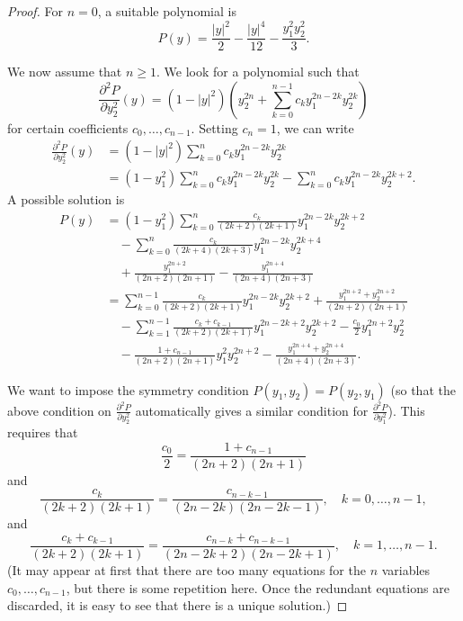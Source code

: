 \documentclass[10pt,a4paper]{amsart}
\begin{document}
\begin{proof}
For $n = 0$, a suitable polynomial is
\[
P(y) = \frac{|y|^2}{2} - \frac{|y|^4}{12} - \frac{y_1^2 y_2^2}{3}.
\]

We now assume that $n \ge 1$. We look for a polynomial such that
\[
\frac{\partial^2 P}{\partial y_2^2}(y) = (1 - |y|^2) \left(y_2^{2n} + \sum_{k = 0}^{n - 1} c_k y_1^{2n - 2k} y_2^{2k}\right)
\]
for certain coefficients $c_0, \dotsc, c_{n - 1}$. Setting $c_n = 1$, we
can write
\[
\begin{split}
\frac{\partial^2 P}{\partial y_2^2}(y) & = (1 - |y|^2) \sum_{k = 0}^n c_k y_1^{2n - 2k} y_2^{2k} \\
& = (1 - y_1^2) \sum_{k = 0}^n c_k y_1^{2n - 2k} y_2^{2k} - \sum_{k = 0}^n c_k y_1^{2n - 2k} y_2^{2k + 2}.
\end{split}
\]
A possible solution is
\[
\begin{split}
P(y) & = (1 - y_1^2) \sum_{k = 0}^n \frac{c_k}{(2k + 2)(2k + 1)} y_1^{2n - 2k} y_2^{2k + 2} \\
& \quad - \sum_{k = 0}^n \frac{c_k}{(2k + 4)(2k + 3)} y_1^{2n - 2k} y_2^{2k + 4} \\
& \quad + \frac{y_1^{2n + 2}}{(2n + 2)(2n + 1)} - \frac{y_1^{2n + 4}}{(2n + 4)(2n + 3)} \\
& = \sum_{k = 0}^{n - 1} \frac{c_k}{(2k + 2)(2k + 1)} y_1^{2n - 2k} y_2^{2k + 2} + \frac{y_1^{2n + 2} + y_2^{2n + 2}}{(2n + 2)(2n + 1)} \\
& \quad - \sum_{k = 1}^{n - 1} \frac{c_k + c_{k - 1}}{(2k + 2)(2k + 1)} y_1^{2n - 2k + 2} y_2^{2k + 2} - \frac{c_0}{2} y_1^{2n + 2} y_2^2 \\
& \quad - \frac{1 + c_{n - 1}}{(2n + 2)(2n + 1)} y_1^2 y_2^{2n + 2} - \frac{y_1^{2n + 4} + y_2^{2n + 4}}{(2n + 4)(2n + 3)}.
\end{split}
\]

We want to impose the symmetry condition $P(y_1, y_2) = P(y_2, y_1)$
(so that the above condition on $\frac{\partial^2 P}{\partial y_2^2}$
automatically gives a similar condition for
$\frac{\partial^2 P}{\partial y_1^2}$). This requires that
\begin{equation} \label{eq:coefficients1}
\frac{c_0}{2} = \frac{1 + c_{n - 1}}{(2n + 2)(2n + 1)}
\end{equation}
and
\begin{equation} \label{eq:coefficients2}
\frac{c_k}{(2k + 2)(2k + 1)} = \frac{c_{n - k - 1}}{(2n - 2k)(2n - 2k - 1)}, \quad k = 0, \dotsc, n - 1,
\end{equation}
and
\begin{equation} \label{eq:coefficients3}
\frac{c_k + c_{k - 1}}{(2k + 2)(2k + 1)} = \frac{c_{n - k} + c_{n - k - 1}}{(2n - 2k + 2)(2n - 2k + 1)}, \quad k = 1, \dotsc, n - 1.
\end{equation}
(It may appear at first that there are too many equations for the $n$ variables
$c_0, \dotsc, c_{n - 1}$, but there is some repetition here.
Once the redundant equations are discarded, it is easy to see that there
is a unique solution.)


\end{proof}
\end{document}
